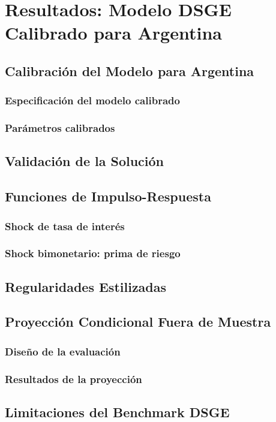
\chapter{Resultados: Modelo DSGE Calibrado para Argentina}
\label{chap:resultados-dsge}

\section{Calibración del Modelo para Argentina}
\label{sec:calibracion}

\subsection{Especificación del modelo calibrado}
\label{subsec:especificacion-calibrada}

\subsection{Parámetros calibrados}
\label{subsec:parametros}

\section{Validación de la Solución}
\label{sec:validacion}

\section{Funciones de Impulso-Respuesta}
\label{sec:irf-dsge}

\subsection{Shock de tasa de interés}
\label{subsec:irf-tasa}

\subsection{Shock bimonetario: prima de riesgo}
\label{subsec:irf-bimonetario}

\section{Regularidades Estilizadas}
\label{sec:regularidades}

\section{Proyección Condicional Fuera de Muestra}
\label{sec:proyeccion}

\subsection{Diseño de la evaluación}
\label{subsec:eval-design}

\subsection{Resultados de la proyección}
\label{subsec:eval-results}

\section{Limitaciones del Benchmark DSGE}
\label{sec:limitaciones-dsge}
